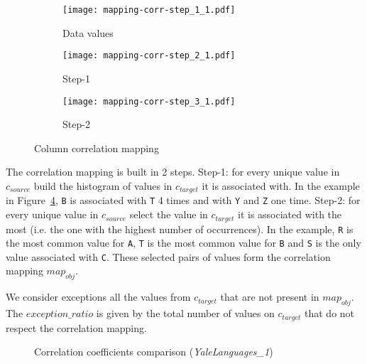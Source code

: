 \begin{figure}[h]
  \centering
  \begin{subfigure}[t]{0.22\linewidth}
    \centering
    \texttt{[image: mapping-corr-step\_1\_1.pdf]}
    \caption[b]{Data values}
    \label{fig:pd:columncorrelation:mapping:step1}
  \end{subfigure}
  \hspace{3em}
  \begin{subfigure}[t]{0.23\linewidth}
    \centering
    \texttt{[image: mapping-corr-step\_2\_1.pdf]}
    \caption[b]{Step-1}
    \label{fig:pd:columncorrelation:mapping:step2}
  \end{subfigure}
  \hspace{3em}
  \begin{subfigure}[t]{0.23\linewidth}
    \centering
    \texttt{[image: mapping-corr-step\_3\_1.pdf]}
    \caption[b]{Step-2}
    \label{fig:pd:columncorrelation:mapping:step3}
  \end{subfigure}
  \caption{Column correlation mapping}
  \label{fig:pd:columncorrelation:mapping}
\end{figure}

The correlation mapping is built in 2 steps. Step-1: for every unique value in \(c_{source}\) build the histogram of values in \(c_{target}\) it is associated with. In the example in Figure~\ref{fig:pd:columncorrelation:mapping}, \verb|B| is associated with \verb|T| 4 times and with \verb|Y| and \verb|Z| one time. Step-2: for every unique value in \(c_{source}\) select the value in \(c_{target}\) it is associated with the most (i.e. the one with the highest number of occurrences). In the example, \verb|R| is the most common value for \verb|A|, \verb|T| is the most common value for \verb|B| and \verb|S| is the only value associated with \verb|C|. These selected pairs of values form the correlation mapping \(map_{obj}\).

We consider exceptions all the values from \(c_{target}\) that are not present in \(map_{obj}\). The \(exception\_ratio\) is given by the total number of values on \(c_{target}\) that do not respect the correlation mapping.

\begin{figure}[h]
\centering
\makebox[\textwidth][c]{
    
}
\caption{Correlation coefficients comparison (\textit{YaleLanguages\_1})}
\label{fig:pd:columncorrelation:corrcoefs}
\end{figure}

